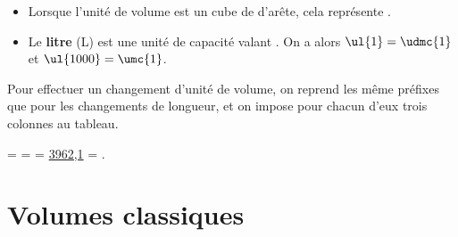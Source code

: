 \begin{definition}
   \begin{itemize}
      \item Lorsque l'unité de volume est un cube de  d'arête, cela représente .
      \item Le {\bf litre} (L) est une unité de capacité valant . On a alors $\ul{1} =\udmc{1}$ et $\ul{1000} =\umc{1}$.
   \end{itemize}
   \vspace*{-4mm}
\end{definition}

\bigskip

Pour effectuer un changement d'unité de volume, on reprend les même préfixes que pour les changements de longueur, et on impose pour chacun d'eux trois colonnes au tableau. \smallskip

\vspace*{-8mm}

\begin{exemple*1}
     =  =  = \ul{3962,1} = .
\end{exemple*1}
   
   
\section{Volumes classiques}

\begin{minipage}[t]{5.5cm}
   \Formule[Volume,Solide=pave,Largeur=5.5cm,Ancre={(2.75,-2)},Couleur=yellow!10]
\end{minipage}
\qquad
\begin{minipage}[t]{4.5cm}
   \Formule[Volume,Solide=prisme,Largeur=4.5cm,Ancre={(2.25,-2)},Couleur=yellow!10]
\end{minipage}
\qquad
\begin{minipage}[t]{6cm}
   \Formule[Volume,Solide=cylindre,Largeur=6cm,Ancre={(3,-2)},Couleur=yellow!10]
\end{minipage}


\exercicesbase


